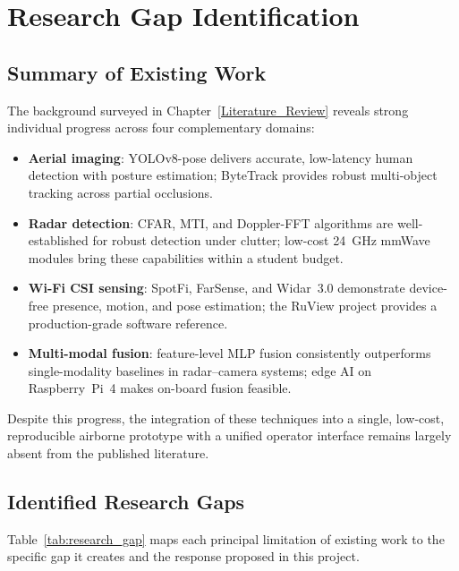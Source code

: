 \chapter{Research Gap Identification}
\label{Research_Gap_Identification}



\section{Summary of Existing Work}
The background surveyed in Chapter~\ref{Literature_Review} reveals strong individual progress across four complementary domains:

\begin{itemize}
    \item \textbf{Aerial imaging}: YOLOv8-pose delivers accurate, low-latency human detection with posture estimation; ByteTrack provides robust multi-object tracking across partial occlusions.
    \item \textbf{Radar detection}: CFAR, MTI, and Doppler-FFT algorithms are well-established for robust detection under clutter; low-cost 24~GHz mmWave modules bring these capabilities within a student budget.
    \item \textbf{Wi-Fi CSI sensing}: SpotFi, FarSense, and Widar~3.0 demonstrate device-free presence, motion, and pose estimation; the RuView project provides a production-grade software reference.
    \item \textbf{Multi-modal fusion}: feature-level MLP fusion consistently outperforms single-modality baselines in radar--camera systems; edge AI on Raspberry~Pi~4 makes on-board fusion feasible.
\end{itemize}

Despite this progress, the integration of these techniques into a single, low-cost, reproducible airborne prototype with a unified operator interface remains largely absent from the published literature.

\section{Identified Research Gaps}
Table~\ref{tab:research_gap} maps each principal limitation of existing work to the specific gap it creates and the response proposed in this project.

